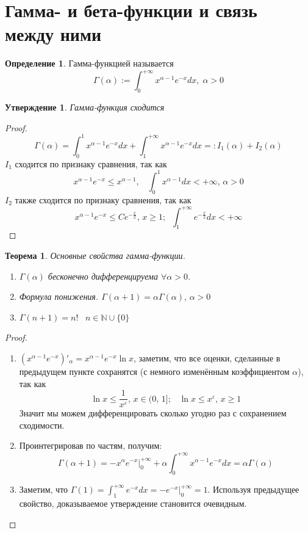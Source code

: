 \documentclass[a4paper,12pt]{article}
\renewcommand{\leq}{\ensuremath{\leqslant}}
\renewcommand{\geq}{\ensuremath{\geqslant}}
\theoremstyle{plain}
\newtheorem{theorem}{Теорема}[section]
\newtheorem{proposition}{Утверждение}[section]
\theoremstyle{definition}
\newtheorem{definition}{Определение}[section]
\theoremstyle{remark}
\begin{document}
\section{Гамма- и бета-функции и связь между ними}
\begin{definition}
	Гамма-функцией называется
	\[\Gamma(\alpha) := \int_0^{+\infty}x^{\alpha - 1}e^{-x}dx,\; \alpha > 0\]
\end{definition}

\begin{proposition}
	Гамма-функция сходится
\end{proposition}

\begin{proof}
	\[\Gamma(\alpha) = \int_0^1 x^{\alpha - 1}e^{-x}dx + \int_1^{+\infty} x^{\alpha - 1}e^{-x}dx =: I_1(\alpha) + I_2(\alpha)\]
	$I_1$ сходится по признаку сравнения, так как
	\[x^{\alpha - 1}e^{-x} \leq x^{\alpha - 1},\;\;\; \int_0^1 x^{\alpha - 1}dx < +\infty,\, \alpha > 0\]
	$I_2$ также сходится по признаку сравнения, так как
	\[x^{\alpha - 1}e^{-x} \leq Ce^{-\frac{x}{2}},\, x \geq 1 ;\;\; \int_1^{+\infty} e^{-\frac{x}{2}}dx < +\infty\]
\end{proof}

\begin{theorem}
	Основные свойства гамма-функции.

	\begin{enumerate}
		\item $\Gamma(\alpha)$ бесконечно дифференцируема $\forall \alpha > 0$.
		\item Формула понижения. $\Gamma(\alpha + 1) = \alpha\Gamma(\alpha),\, \alpha > 0$
		\item $\Gamma(n + 1) = n!\;\;\; n \in \mathbb{N} \cup \{0\}$
	\end{enumerate}
\end{theorem}
\begin{proof}
	\begin{enumerate}
		\item $(x^{\alpha - 1}e^{-x})'_\alpha = x^{\alpha - 1}e^{-x}\ln x$, заметим, что все оценки, сделанные в предыдущем пункте сохранятся (с немного изменённым коэффициентом $\alpha$), так как
		      \[\ln x \leq \frac{1}{x^\varepsilon},\,x\in(0,\,1];\;\;\; \ln x \leq x^\varepsilon,\, x \geq 1\]
		      Значит мы можем дифференцировать сколько угодно раз с сохранением сходимости.
		\item Проинтегрировав по частям, получим:
		      \[\Gamma(\alpha + 1) = -x^\alpha e^{-x}|^{+\infty}_0 + \alpha\int_0^{+\infty}x^{\alpha - 1}e^{-x}dx = \alpha\Gamma(\alpha)\]
		\item Заметим, что $\Gamma(1) = \int_1^{+\infty} e^{-x}dx = -e^{-x}|^{+\infty}_0 = 1$. Используя предыдущее свойство, доказываемое утверждение становится очевидным.
	\end{enumerate}
\end{proof}
\end{document}
